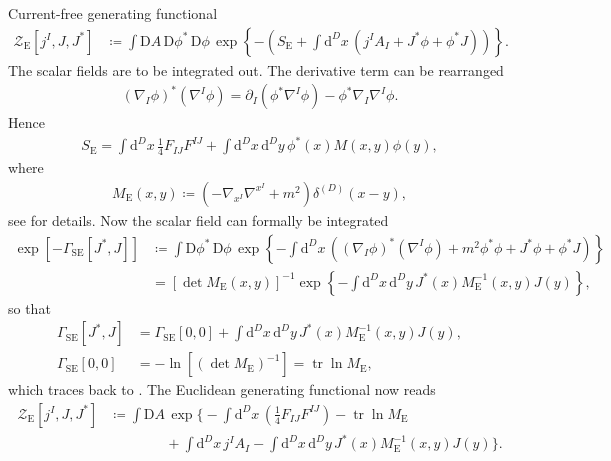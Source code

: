 \documentclass[12pt]{article}
\newcommand\dif{\mathrm{d}}
\newcommand\Dif{\mathrm{D}}
\DeclareMathOperator{\tr}{tr}
\newcommand{\rbr}[1]{{\left(#1\right)}}
\newcommand{\sbr}[1]{{\left[#1\right]}}
\newcommand{\rfun}[2]{{#1}\mathopen{}\left(#2\right)\mathclose{}}
\newcommand{\sfun}[2]{{#1}\mathopen{}\left[#2\right]\mathclose{}}
\newcommand{\cfun}[2]{{#1}\mathopen{}\left\{#2\right\}\mathclose{}}
\begin{document}
Current-free generating functional
\begin{align}
\sfun{\mathcal{Z}_\text{E}}{j^I, J, J^*} &\coloneqq
\int\Dif A\,\Dif\phi^*\,\Dif\phi\,\cfun{\exp}{-\rbr{S_\text{E}
+\int\dif^{D} x\,\rbr{j^I A_I + J^* \phi+\phi^* J}}}.
\end{align}
The scalar fields are to be integrated out. The derivative term can be 
rearranged
\begin{align}
\rbr{\nabla_{\! I} \phi}^* \rbr{\nabla^{I} \phi} = \partial_I\rbr{\phi^* 
\nabla^{I}\phi} - \phi^* \nabla_{\! I} \nabla^{I} \phi.
\end{align}
Hence
\begin{align}
S_\text{E} = \int \dif^D x\, \frac{1}{4} F_{IJ} F^{IJ} +
\int \dif^D x\,\dif^D y\, \rfun{\phi^*}{x} \rfun{M}{x,y} \rfun{\phi}{y},
\end{align}
where
\begin{align}
\rfun{M_\text{E}}{x,y} \coloneqq \rbr{-\nabla_{\! x^I} \nabla^{x^I} + m^2} 
\rfun{\delta^{(D)}}{x-y},
\end{align}
see \cite[ch.\ 6]{mosel2004} for details. Now the scalar field can formally be 
integrated
\begin{align}
\sfun{\exp}{-\sfun{\varGamma_\text{SE}}{J^*, J}} &\coloneqq \int 
	\Dif\phi^*\,\Dif\phi\, \cfun{\exp}{-\int\dif^{D} x\, \rbr{
	\rbr{\nabla_{\! I} \phi}^* \rbr{\nabla^{I} \phi} + m^2 \phi^* \phi 
	+ J^* \phi + \phi^* J}}
\nonumber \\
&= \sbr{\det \rfun{M_{\text{E}}}{x,y}}^{-1}
	\cfun{\exp}{-\int\dif^D x\,\dif^D y\,
		\rfun{J^*}{x}\rfun{M_\text{E}^{-1}}{x,y} \rfun{J}{y} },
\end{align}
so that
\begin{align}
\sfun{\varGamma_{\text{SE}}}{J^*, J} &= \sfun{\varGamma_{\text{SE}}}{0,0} +
	\int\dif^D x\,\dif^D y\,
		\rfun{J^*}{x}\rfun{M_{\text{E}}^{-1}}{x,y} \rfun{J}{y},
\\
\sfun{\varGamma_{\text{SE}}}{0,0} &=
	-\sfun{\ln}{\rbr{\det M_\text{E}}^{-1}} = \tr\ln M_\text{E},
\end{align}
which traces back to \cite{weisskopf1936}. The Euclidean generating functional 
now reads
\begin{align}
\sfun{\mathcal{Z}_\text{E}}{j^I, J, J^*} &\coloneqq
\int\Dif A\, \exp\!\bigg\{-\int \dif^D x\,
\rbr{\frac{1}{4} F_{IJ} F^{IJ}} - \tr\ln M_\text{E}
\nonumber \\
&\qquad\qquad + \int \dif^D x\, j^{I} A_{I} 
- \int\dif^D x\,\dif^D y\,
	\rfun{J^*}{x}\rfun{M_\text{E}^{-1}}{x,y} \rfun{J}{y}\bigg\}.
\label{eq:eucl-weis-100}
\end{align}
\end{document}
